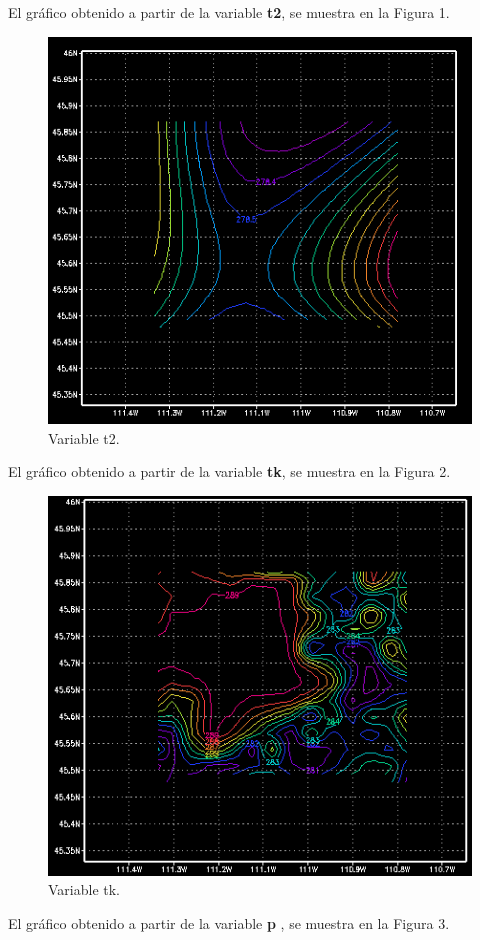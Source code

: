 \documentclass[12pt,letter]{article}
\begin{document}
\noindent El gr\'afico obtenido a partir de la variable \textbf{t2}, se muestra en la Figura 1.
\begin{figure}
\caption{Variable t2.}
\includegraphics[scale=1]{grads_01.png}
\end{figure}

\noindent El gr\'afico obtenido a partir de la variable \textbf{tk}, se muestra en la Figura 2.

\begin{figure}
\caption{Variable tk.}
\includegraphics[scale=1]{grads_tk.png}
\end{figure}
\noindent El gr\'afico obtenido a partir de la variable \textbf{p} , se muestra en la Figura 3.
\end{document}
